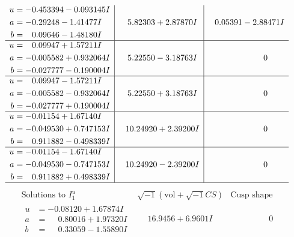 \documentclass[1p]{elsarticle_modified}
\theoremstyle{definition}
\newcommand{\I}{\sqrt{-1}}
\begin{document}
$$\begin{array}{c|c|c}
\begin{aligned}
u &= -0.453394 - 0.093145 I \\
a &= -0.29248 - 1.41477 I \\
b &= \phantom{-}0.09646 - 1.48180 I\end{aligned}
 & \phantom{-}5.82303 + 2.87870 I & \phantom{-}0.05391 - 2.88471 I \\ \hline\begin{aligned}
u &= \phantom{-}0.09947 + 1.57211 I \\
a &= -0.005582 + 0.932064 I \\
b &= -0.027777 - 0.190004 I\end{aligned}
 & \phantom{-}5.22550 - 3.18763 I & \phantom{-0.000000 } 0 \\ \hline\begin{aligned}
u &= \phantom{-}0.09947 - 1.57211 I \\
a &= -0.005582 - 0.932064 I \\
b &= -0.027777 + 0.190004 I\end{aligned}
 & \phantom{-}5.22550 + 3.18763 I & \phantom{-0.000000 } 0 \\ \hline\begin{aligned}
u &= -0.01154 + 1.67140 I \\
a &= -0.049530 + 0.747153 I \\
b &= \phantom{-}0.911882 - 0.498339 I\end{aligned}
 & \phantom{-}10.24920 + 2.39200 I & \phantom{-0.000000 } 0 \\ \hline\begin{aligned}
u &= -0.01154 - 1.67140 I \\
a &= -0.049530 - 0.747153 I \\
b &= \phantom{-}0.911882 + 0.498339 I\end{aligned}
 & \phantom{-}10.24920 - 2.39200 I & \phantom{-0.000000 } 0\\
 \hline 
 \end{array}$$\newpage$$\begin{array}{c|c|c}  
\text{Solutions to }I^u_{1}& \I (\text{vol} + \sqrt{-1}CS) & \text{Cusp shape}\\
 \hline 
\begin{aligned}
u &= -0.08120 + 1.67874 I \\
a &= \phantom{-}0.80016 + 1.97320 I \\
b &= \phantom{-}0.33059 - 1.55890 I\end{aligned}
 & \phantom{-}16.9456 + 6.9601 I & \phantom{-0.000000 } 0 \\ \hline\begin{aligned}

\end{aligned}
\end{array}$$
\end{document}
